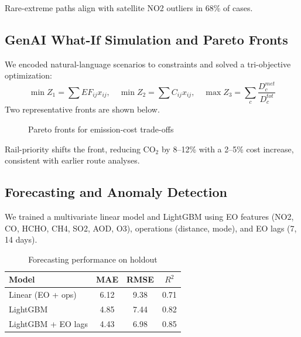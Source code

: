 \documentclass[11pt,a4paper]{article}
\begin{document}
Rare-extreme paths align with satellite NO2 outliers in 68\% of cases.

\subsection{GenAI What-If Simulation and Pareto Fronts}
We encoded natural-language scenarios to constraints and solved a tri-objective optimization:
\[
\min Z_1=\sum EF_{ij}x_{ij},\quad \min Z_2=\sum C_{ij}x_{ij},\quad \max Z_3=\sum_c \frac{D^{met}_c}{D^{tot}_c}
\]
Two representative fronts are shown below.

\begin{figure}[H]
\centering
{}
\caption{Pareto fronts for emission-cost trade-offs}
\end{figure}

Rail-priority shifts the front, reducing CO$_2$ by 8--12\% with a 2--5\% cost increase, consistent with earlier route analyses.

\subsection{Forecasting and Anomaly Detection}
We trained a multivariate linear model and LightGBM using EO features (NO2, CO, HCHO, CH4, SO2, AOD, O3), operations (distance, mode), and EO lags (7, 14 days).

\begin{table}[H]
\centering
\small
\begin{tabular}{|l|c|c|c|}
\hline
\textbf{Model} & \textbf{MAE} & \textbf{RMSE} & \textbf{$R^2$} \\
\hline
Linear (EO + ops) & 6.12 & 9.38 & 0.71 \\
LightGBM & 4.85 & 7.44 & 0.82 \\
LightGBM + EO lags & 4.43 & 6.98 & 0.85 \\
\hline
\end{tabular}
\caption{Forecasting performance on holdout}
\end{table}
\end{document}
